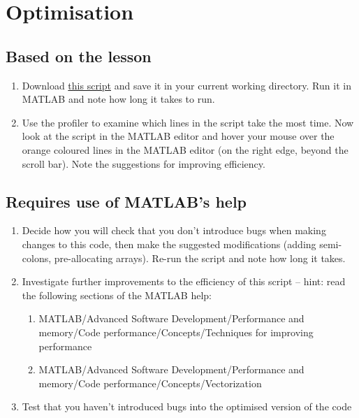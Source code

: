 \documentclass{article}
\begin{document}
	\section{Optimisation}
		\subsection*{Based on the lesson}
			\begin{enumerate}
				\item Download \href{https://github.com/UoMResearchIT/MATLAB-online-exercises/raw/master/lesson5_programming/loopy.m}{this script} and save it in your current working directory. Run it in MATLAB and note how long it takes to run. 
				
				\item Use the profiler to examine which lines in the script take the most time. Now look at the script in the MATLAB editor and hover your mouse over the orange coloured lines in the MATLAB editor (on the right edge, beyond the scroll bar). Note the suggestions for improving efficiency.
			\end{enumerate}	
		
		\subsection*{Requires use of MATLAB's help}
		\begin{enumerate}[resume]
			\item Decide how you will check that you don't introduce bugs when making changes to this code, then make the suggested modifications (adding semi-colons, pre-allocating arrays). Re-run the script and note how long it takes.
			\item Investigate further improvements to the efficiency of this script -- hint: read the following sections of the MATLAB help:
			\begin{enumerate}
				\item MATLAB/Advanced Software Development/Performance and memory/Code performance/Concepts/Techniques for improving performance
				\item MATLAB/Advanced Software Development/Performance and memory/Code performance/Concepts/Vectorization
			\end{enumerate}
			\item Test that you haven't introduced bugs into the optimised version of the code
		\end{enumerate}
\end{document}

